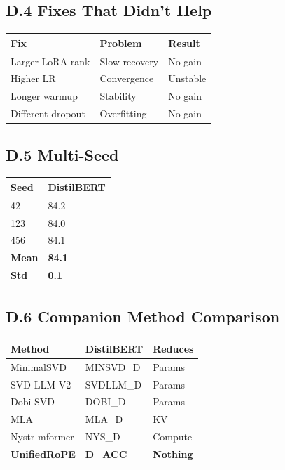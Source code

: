 \subsection{D.4 Fixes That Didn't Help}

\begin{table}[H]
\centering
\small
\begin{tabular}{lll}
\toprule
\textbf{Fix} & \textbf{Problem} & \textbf{Result} \\
\midrule
Larger LoRA rank & Slow recovery & No gain \\
Higher LR & Convergence & Unstable \\
Longer warmup & Stability & No gain \\
Different dropout & Overfitting & No gain \\
\bottomrule
\end{tabular}
\end{table}

\subsection{D.5 Multi-Seed}

\begin{table}[H]
\centering
\small
\begin{tabular}{ll}
\toprule
\textbf{Seed} & \textbf{DistilBERT} \\
\midrule
42 & 84.2 \\
123 & 84.0 \\
456 & 84.1 \\
\textbf{Mean} & \textbf{84.1} \\
\textbf{Std} & \textbf{0.1} \\
\bottomrule
\end{tabular}
\end{table}

\subsection{D.6 Companion Method Comparison}

\begin{table}[H]
\centering
\small
\begin{tabular}{lll}
\toprule
\textbf{Method} & \textbf{DistilBERT} & \textbf{Reduces} \\
\midrule
MinimalSVD & {{MINSVD\_D}} & Params \\
SVD-LLM V2 & {{SVDLLM\_D}} & Params \\
Dobi-SVD & {{DOBI\_D}} & Params \\
MLA & {{MLA\_D}} & KV \\
Nystr mformer & {{NYS\_D}} & Compute \\
\textbf{UnifiedRoPE} & \textbf{{{D\_ACC}}} & \textbf{Nothing} \\
\bottomrule
\end{tabular}
\end{table}

